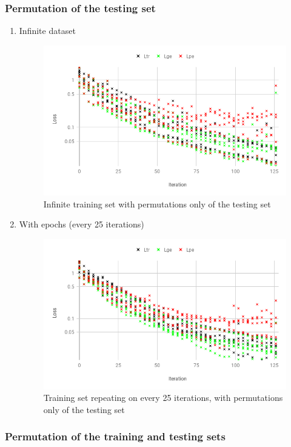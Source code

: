 \subsubsection {Permutation of the testing set}

    \begin{enumerate}[label=(\Alph*)]

        \item Infinite dataset
        
        \begin{figure}[!htb]
            \centering
            \includegraphics[width=.45\linewidth]{fig/content/results/shortest_path/base.png}
            \caption{Infinite training set with permutations only of the testing set}
            \label{fig:shotest_paths_base_results}
        \end{figure}
        
        \item With epochs (every 25 iterations)
        
        \begin{figure}[H]
            \centering
            \includegraphics[width=.45\linewidth]{fig/content/results/shortest_path/epochs_base.png}
            \caption{Training set repeating on every 25 iterations, with permutations only of the testing set}
            \label{fig:shotest_paths_base_epochs_results}
        \end{figure}

    \end{enumerate}

\subsubsection {Permutation of the training and testing sets}

